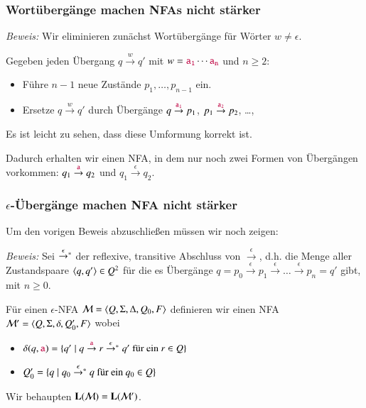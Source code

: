 \documentclass[onlymath]{beamer}
\begin{document}
\begin{frame}\frametitle{Wortübergänge machen NFAs nicht stärker}

\pause

\emph{Beweis:} Wir eliminieren zunächst Wortübergänge für Wörter $w\neq\epsilon$.\medskip
\pause

Gegeben jeden Übergang $q\stackrel{w}{\to}q'$ mit $w=\mathtt{\textcolor{purple}{a_1}}\cdots \mathtt{\textcolor{purple}{a_n}}$ und $n\geq 2$:\\
\begin{itemize}
\item Führe $n-1$ neue Zustände $p_1,\ldots,p_{n-1}$ ein.
\item Ersetze $q\stackrel{w}{\to}q'$ durch Übergänge $q\stackrel{\mathtt{\textcolor{purple}{a_1}}}{\to}p_1$, $p_1\stackrel{\mathtt{\textcolor{purple}{a_2}}}{\to}p_2$, \ldots, 
\end{itemize}
Es ist leicht zu sehen, dass diese Umformung korrekt ist.
\bigskip

Dadurch erhalten wir einen NFA, in dem nur noch zwei Formen von Übergängen vorkommen:
$q_1\stackrel{\mathtt{\textcolor{purple}{a}}}{\to}q_2$ und $q_1\stackrel{\epsilon}{\to}q_2$.

\end{frame}

\begin{frame}\frametitle{$\epsilon$-Übergänge machen NFA nicht stärker}


Um den vorigen Beweis abzuschließen müssen wir noch zeigen:


\emph{Beweis:} Sei $\mathrel{\mathord{\stackrel{\epsilon}{\to}}{}^*}$ der reflexive, transitive Abschluss von $\stackrel{\epsilon}{\to}$, d.h. die Menge aller Zustandspaare $\langle{q,q'}\rangle\in Q^2$ für die es Übergänge $q=p_0\stackrel{\epsilon}{\to} p_1\stackrel{\epsilon}{\to}\ldots\stackrel{\epsilon}{\to}p_n=q'$ gibt, mit $n\geq 0$.
\medskip

Für einen $\epsilon$-NFA $\mathcal{M}=\langle{Q,\Sigma,\Delta,Q_0,F}\rangle$ definieren wir einen NFA
$\mathcal{M}'=\langle{Q,\Sigma,\delta,Q_0',F}\rangle$ wobei
\begin{itemize}
\item $\delta(q,\mathtt{\textcolor{purple}{a}})=\{ q'\mid q\stackrel{\mathtt{\textcolor{purple}{a}}}{\to}r\mathrel{\mathord{\stackrel{\epsilon}{\to}}{}^*} q'\text{ für ein }r\in Q\}$
\item $Q_0'=\{q\mid q_0\mathrel{\mathord{\stackrel{\epsilon}{\to}}{}^*} q\text{ für ein }q_0\in Q\}$
\end{itemize}
Wir behaupten $\textbf{\textcolor{black}{L}}(\mathcal{M})=\textbf{\textcolor{black}{L}}(\mathcal{M}')$.

\end{frame}
\end{document}
